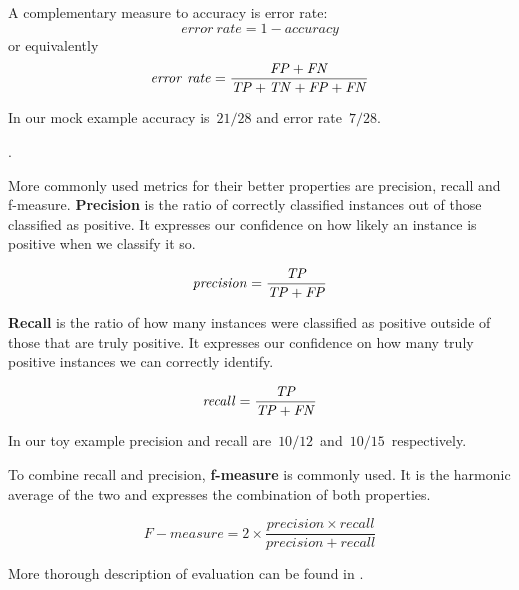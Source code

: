A complementary measure to accuracy is error rate:
\begin{equation}
\mathit{error~rate} = 1 - \mathit{accuracy}
\end{equation}
or equivalently
\begin{equation}
\mathit{error~rate} = \frac{\mathit{FP} + \mathit{FN}}{\mathit{TP} + \mathit{TN} + \mathit{FP} + \mathit{FN}}
\end{equation}

In our mock example accuracy is~$21/28$ and error rate~$7/28$.

.

More commonly used metrics for their better properties are precision, recall and f-measure.
{\bf Precision} is the ratio of correctly classified instances out of those classified as positive.
It expresses our confidence on how likely an instance is positive when we classify it so.

\begin{equation}
\mathit{precision} = \frac{\mathit{TP}}{\mathit{TP} + \mathit{FP}}
\end{equation}

{\bf Recall} is the ratio of how many instances were classified as positive
outside of those that are truly positive.
It expresses our confidence on how many truly positive instances we can correctly identify.

\begin{equation}
\mathit{recall} = \frac{\mathit{TP}}{\mathit{TP} + \mathit{FN}}
\end{equation}

In our toy example precision and recall are~$10/12$~and~$10/15$~respectively.

To combine recall and precision, {\bf f-measure} is commonly used.
It is the harmonic average of the two and expresses the combination of both properties.

\begin{equation}
	\mathit{F-measure} = 2 \times \frac{\mathit{precision}\times \mathit{recall}}{\mathit{precision} + \mathit{recall}}
\end{equation}


More thorough description of evaluation can be found in .



\subsection{}


